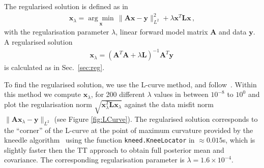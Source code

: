 The regularised solution is defined as in~\cite{hansen2010discrete, fox2016fast} 
\begin{align}
	\bm{x}_{\lambda} =\underset{ \bm{x}}{\arg \min}\,  \lVert \bm{A}\bm{x} - \bm{y} \rVert_{L^2}^2 + \lambda \bm{x}^T \bm{L} \bm{x} \, ,
	\label{eq:XLam}
\end{align}
with the regularisation parameter $\lambda$, linear forward model matrix $\bm{A}$ and data $\bm{y}$.
A regularised solution
\begin{align}
	\bm{x}_{\lambda} = (\bm{A}^T\bm{A} + \lambda \bm{L} )^{-1} \bm{A}^T \bm{y} \label{eq:xLam} \, 
\end{align}
is calculated as in Sec.~\ref{sec:reg}.


To find the regularised solution, we use the L-curve method, and follow~\cite{hansen1993use}.
Within this method we compute $\bm{x}_\lambda$, for 200 different $\lambda$ values in between $10^{-8}$ to $10^{0}$ and plot the regularisation norm $\sqrt{\bm{x}_\lambda^T\mathbf{L} \bm{x}_\lambda}$ against the data misfit norm $\lVert \bm{A}\bm{x}_\lambda - \bm{y} \rVert_{L^2}$ (see Figure \ref{fig:LCurve}). 
The regularised solution corresponds to the ``corner'' of the L-curve at the point of maximum curvature provided by the kneedle algorithm~\cite{satopaa2011kneedle} using the function \texttt{kneed.KneeLocator} in $\approx 0.015$s, which is slightly faster then the TT approach to obtain full posterior mean and covariance.
The corresponding regularisation parameter is $\lambda = 1.6 \times 10^{-4}$.
